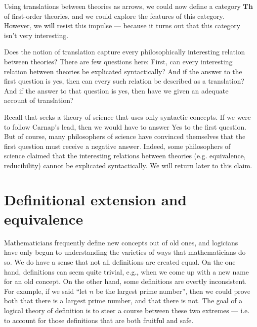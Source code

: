 





\begin{disc} Using translations between theories as arrows, we could
  now define a category $\mathbf{Th}$ of first-order theories, and we
  could explore the features of this category.  However, we will
  resist this impulse --- because it turns out that this category
  isn't very interesting.  \end{disc}

\begin{disc} Does the notion of translation capture every
  philosophically interesting relation between theories?  There are
  few questions here: First, can every interesting relation between
  theories be explicated syntactically?  And if the answer to the
  first question is yes, then can every such relation be described as
  a translation?  And if the answer to that question is yes, then have
  we given an adequate account of translation?

  Recall that \cite{carnap1934} seeks a theory of science that uses
  only syntactic concepts.  If we were to follow Carnap's lead, then
  we would have to answer Yes to the first question.  But of course,
  many philosophers of science have convinced themselves that the
  first question must receive a negative answer.  Indeed, some
  philosophers of science claimed that the interesting relations
  between theories (e.g. equivalence, reducibility) cannot be
  explicated syntactically.  We will return later to this
  claim.  \end{disc}



\section{Definitional extension and equivalence} \label{sec-def}





Mathematicians frequently define new concepts out of old ones, and
logicians have only begun to understanding the varieties of ways that
mathematicians do so.  We do have a sense that not all definitions are
created equal.  On the one hand, definitions can seem quite trivial,
e.g., when we come up with a new name for an old concept.  On the
other hand, some definitions are overtly inconsistent.  For example,
if we said ``let $n$ be the largest prime number'', then we could
prove both that there is a largest prime number, and that there is
not.  The goal of a logical theory of definition is to steer a course
between these two extremes --- i.e. to account for those definitions
that are both fruitful and safe.


